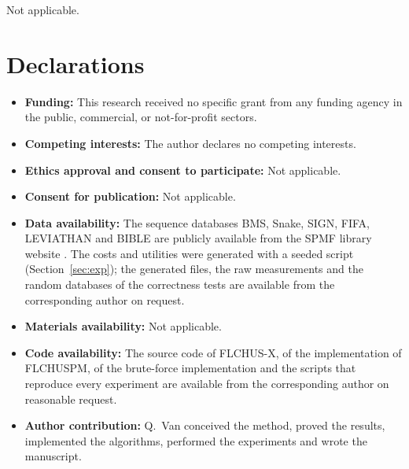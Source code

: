 \documentclass[pdflatex,sn-mathphys,Numbered]{sn-jnl}
\theoremstyle{thmstyleone}
\theoremstyle{thmstyletwo}
\theoremstyle{thmstylethree}
\newcommand{\FL}{\textsc{FLCHUSPM}}
\newcommand{\FX}{\textsc{FLCHUS-X}}
\begin{document}
\backmatter

Not applicable.

\section*{Declarations}

\begin{itemize}
\item \textbf{Funding:} This research received no specific grant from any funding agency in the public, commercial, or not-for-profit sectors.
\item \textbf{Competing interests:} The author declares no competing interests.
\item \textbf{Ethics approval and consent to participate:} Not applicable.
\item \textbf{Consent for publication:} Not applicable.
\item \textbf{Data availability:} The sequence databases BMS, Snake, SIGN, FIFA, LEVIATHAN and BIBLE are publicly available from the SPMF library website \cite{fournier2016spmf}. The costs and utilities were generated with a seeded script (Section~\ref{sec:exp}); the generated files, the raw measurements and the random databases of the correctness tests are available from the corresponding author on request.
\item \textbf{Materials availability:} Not applicable.
\item \textbf{Code availability:} The source code of \FX{}, of the implementation of \FL{}, of the brute-force implementation and the scripts that reproduce every experiment are available from the corresponding author on reasonable request.
\item \textbf{Author contribution:} Q.~Van conceived the method, proved the results, implemented the algorithms, performed the experiments and wrote the manuscript.
\end{itemize}


\end{document}

